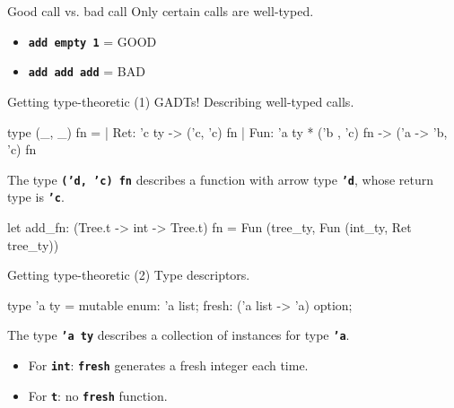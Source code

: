 \documentclass[final,xetex]{beamer}
\newcommand{\red}[1]{{\color{orange2}#1}}
\newcommand{\green}[1]{{\color{chameleon3}#1}}
\newcommand{\code}[1]{\texttt{\textbf{#1}}}
\begin{document}
\begin{frame}{Good call \green{vs.} bad call}
  Only \green{certain} calls are \green{well-typed}.

  \begin{itemize}
    \item \code{add empty 1} = \green{GOOD}
    \item \code{add add add} = \red{BAD}
  \end{itemize}
\end{frame}

\begin{frame}[fragile]{Getting type-theoretic (1)}
  GADTs! Describing well-typed calls.

\bigskip

\begin{ocamlcode}
  type (_, _) fn =
  | Ret: 'c ty -> ('c, 'c) fn
  | Fun: 'a ty * ('b , 'c) fn -> ('a -> 'b, 'c) fn
\end{ocamlcode}

\bigskip

The type \code{('d, 'c) fn} describes a function with arrow type \code{'d},
whose return type is \code{'c}.

\pause

\bigskip

\begin{ocamlcode}
  let add_fn: (Tree.t -> int -> Tree.t) fn =
    Fun (tree_ty, Fun (int_ty, Ret tree_ty))
\end{ocamlcode}

\end{frame}

\begin{frame}[fragile]{Getting type-theoretic (2)}
  Type descriptors.

  \bigskip

  \begin{ocamlcode}
type 'a ty = {
  mutable enum: 'a list;
  fresh: ('a list -> 'a) option;
}
  \end{ocamlcode}

  \bigskip

  The type \code{'a ty} describes a \green{collection of instances} for type
  \code{'a}.

  \bigskip

  \begin{itemize}
    \item For \code{int}: \code{fresh} generates a fresh integer each time.
    \item For \code{t}: no \code{fresh} function.
  \end{itemize}
\end{frame}
\end{document}

